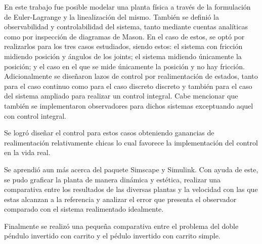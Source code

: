 %
%

En este trabajo fue posible modelar una planta física a través de la formulación de Euler-Lagrange y la linealización del mismo. También se definió la observabilidad y controlabilidad del sistema, tanto mediante cuentas analíticas como por inspección de diagramas de Mason. En el caso de estos, se optó por realizarlos para los tres casos estudiados, siendo estos: el sistema con fricción midiendo posición y ángulos de los joints; el sistema midiendo únicamente la posición; y el caso en el que se mide únicamente la posición y no hay fricción.
Adicionalmente se diseñaron lazos de control por realimentación de estados, tanto para el caso continuo como para el caso discreto discreto y también para el caso del sistema ampliado para realizar un control integral. Cabe mencionar que también se implementaron observadores para dichos sistemas exceptuando aquel con control integral.

Se logró diseñar el control para estos casos obteniendo ganancias de realimentación relativamente chicas lo cual favorece la implementación del control en la vida real.

Se aprendió aun más acerca del paquete Simscape y Simulink. Con ayuda de este, se pudo graficar la planta de manera dinámica y estética, realizar una comparativa entre los resultados de las diversas plantas y la velocidad con las que estas alcanzan a la referencia y analizar el error que presenta el observador comparado con el sistema realimentado idealmente.

Finalmente se realizó una pequeña comparativa entre el problema del doble péndulo invertido con carrito y el pédulo invertido con carrito simple.
%